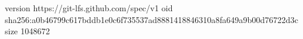version https://git-lfs.github.com/spec/v1
oid sha256:a0b46799c617bddb1e0c6f735537ad8881418846310a8fa649a9b00d76722d3c
size 1048672
